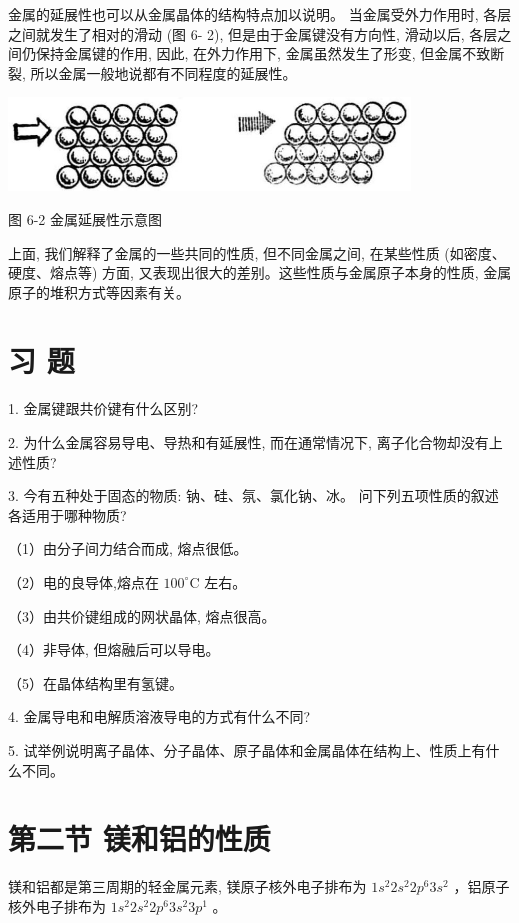 \documentclass[10pt]{article}
\begin{document}
金属的延展性也可以从金属晶体的结构特点加以说明。 当金属受外力作用时, 各层之间就发生了相对的滑动 (图 6- 2), 但是由于金属键没有方向性, 滑动以后, 各层之间仍保持金属键的作用, 因此, 在外力作用下, 金属虽然发生了形变, 但金属不致断裂, 所以金属一般地说都有不同程度的延展性。

\begin{center}
\includegraphics[max width=0.8\textwidth]{images/01912d13-9986-7822-a012-3f3f7be99dcb_183_295339.jpg}
\end{center}

图 6-2 金属延展性示意图

上面, 我们解释了金属的一些共同的性质, 但不同金属之间, 在某些性质 (如密度、硬度、熔点等) 方面, 又表现出很大的差别。这些性质与金属原子本身的性质, 金属原子的堆积方式等因素有关。

\section*{习 题}

1. 金属键跟共价键有什么区别?

2. 为什么金属容易导电、导热和有延展性, 而在通常情况下, 离子化合物却没有上述性质?

3. 今有五种处于固态的物质: 钠、硅、氛、氯化钠、冰。 问下列五项性质的叙述各适用于哪种物质?

（1）由分子间力结合而成, 熔点很低。

（2）电的良导体,熔点在 \({100}^{ \circ }\mathrm{C}\) 左右。

（3）由共价键组成的网状晶体, 熔点很高。

（4）非导体, 但熔融后可以导电。

（5）在晶体结构里有氢键。

4. 金属导电和电解质溶液导电的方式有什么不同?

5. 试举例说明离子晶体、分子晶体、原子晶体和金属晶体在结构上、性质上有什么不同。

\section*{第二节 镁和铝的性质}

镁和铝都是第三周期的轻金属元素, 镁原子核外电子排布为 \(1{s}^{2}2{s}^{2}2{p}^{6}3{s}^{2}\) ，铝原子核外电子排布为 \(1{s}^{2}2{s}^{2}2{p}^{6}3{s}^{2}3{p}^{1}\) 。
\end{document}
